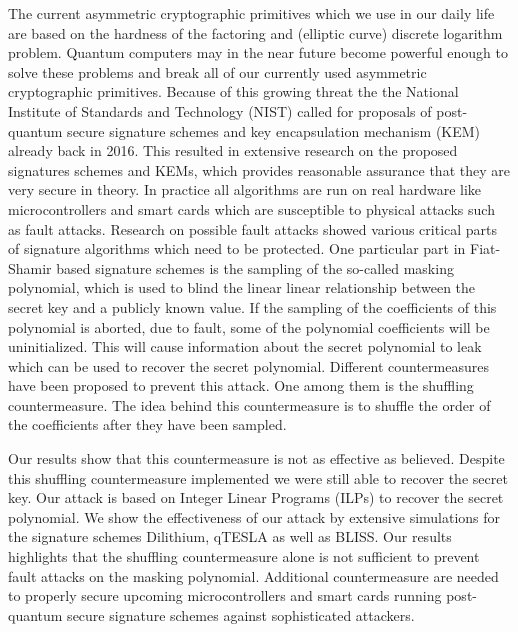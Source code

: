 %
\label{sec:abstract}

The current asymmetric cryptographic primitives which we use in our daily life are based on the hardness of the factoring and (elliptic curve) discrete logarithm problem. 
Quantum computers may in the near future become powerful enough to solve these problems and break all of our currently used asymmetric cryptographic primitives.
Because of this growing threat the the National Institute of Standards and Technology (NIST) called for proposals of post-quantum secure signature schemes and key encapsulation mechanism (KEM) already back in 2016. This resulted in extensive research on the proposed signatures schemes and KEMs, which provides reasonable assurance that they are very secure in theory.
In practice all algorithms are run on real hardware like microcontrollers and smart cards which are susceptible to physical attacks such as fault attacks. Research on possible fault attacks showed various critical parts of signature algorithms which need to be protected. One particular part in Fiat-Shamir based signature schemes is the sampling of the so-called masking polynomial, which is used to blind the linear linear relationship between the secret key and a publicly known value.
If the sampling of the coefficients of this polynomial is aborted, due to fault, some of the polynomial coefficients will be uninitialized. This will cause information about the secret polynomial to leak which can be used to recover the secret polynomial.
Different countermeasures have been proposed to prevent this attack. One among them is the shuffling countermeasure. The idea behind this countermeasure is to shuffle the order of the coefficients after they have been sampled.

Our results show that this countermeasure is not as effective as believed. Despite this shuffling countermeasure implemented we were still able to recover the secret key.
Our attack is based on Integer Linear Programs (ILPs) to recover the secret polynomial.
We show the effectiveness of our attack by extensive simulations for the signature schemes Dilithium, qTESLA as well as BLISS.
Our results highlights that the shuffling countermeasure alone is not sufficient to prevent fault attacks on the masking polynomial. Additional countermeasure are needed to properly secure upcoming microcontrollers and smart cards running post-quantum secure signature schemes against sophisticated attackers.


